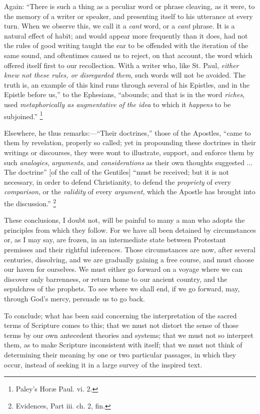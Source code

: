 Again: ``There is such a thing as a peculiar word or phrase
cleaving, as it were, to the memory of a writer or speaker, and
presenting itself to his utterance at every turn. When we observe
this, we call it a \emph{cant} word, or a \emph{cant} phrase. It is a
natural effect of habit; and would appear more frequently than it
does, had not the rules of good writing taught the ear to be offended
with the iteration of the same sound, and oftentimes caused us to
reject, on that account, the word which offered itself first to our
recollection. With a writer who, like St. Paul, \emph{either knew not
these rules, or disregarded them}, such words will not be avoided.
The truth is, an example of this kind runs through several of his
Epistles, and in the Epistle before us,'' to the Ephesians,
``abounds; and that is in the word \emph{riches}, used \emph{metaphorically
as augmentative} \emph{of the idea} to which it \emph{happens} to be
subjoined.'' \footnote{Paley's Horæ
Paul. vi. 2.}

Elsewhere, he thus remarks:—``Their doctrines,'' those of
the Apostles, ``came to them by revelation, properly so called;
yet in propounding these doctrines in their writings or discourses,
they were wont to illustrate, support, and enforce them by such \emph{analogies},
\emph{arguments}, and \emph{considerations} as their own thoughts
suggested ... The doctrine'' [of the call of the Gentiles]
``must be received; but it is not necessary, in order to defend
Christianity, to defend the \emph{propriety} of every \emph{comparison},
or the \emph{validity} of every \emph{argument}, which the Apostle has
brought into the discussion.'' \footnote{Evidences, Part
iii. ch. 2, fin.}

These conclusions, I doubt not, will be painful to many a man who
adopts the principles from which they follow. For we have all been
detained by circumstances or, as I may say, are frozen, in an
intermediate state between Protestant premisses and their rightful
inferences. Those circumstances are now, after several centuries,
dissolving, and we are gradually gaining a free course, and must
choose our haven for ourselves. We must either go forward on a voyage
where we can discover only barrenness, or return home to our ancient
country, and the sepulchres of the prophets. To see where we shall
end, if we go forward, may, through God's mercy, persuade us to go
back.

To conclude; what has been said concerning the interpretation of
the sacred terms of Scripture comes to this; that we must not
distort the sense of those terms by our own antecedent theories and
systems; that we must not so interpret them, as to make Scripture
inconsistent with itself; that we must not think of determining their
meaning by one or two particular passages, in which they occur,
instead of seeking it in a large survey of the inspired text.

